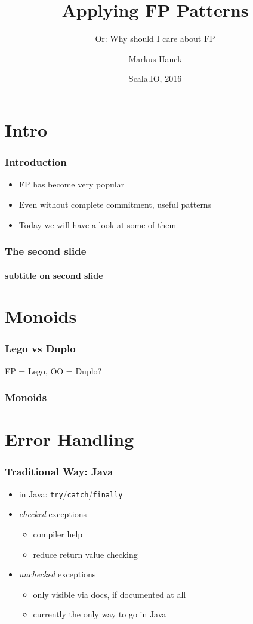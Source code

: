 \documentclass{beamer}
\title{Applying FP Patterns}
\subtitle{Or: Why should I care about FP}
\author{Markus Hauck}
\date{Scala.IO, 2016}
\begin{document}
\frame{\titlepage}

\section{Intro}
\label{sec:intro}

\begin{frame}
  \frametitle{Introduction}
  \begin{itemize}
  \item FP has become very popular
  \item Even without complete commitment, useful patterns
  \item Today we will have a look at some of them
  \end{itemize}
\end{frame}
\begin{frame}
  \frametitle{The second slide}
  \framesubtitle{subtitle on second slide}
\end{frame}

\section{Monoids}
\label{sec:monoids}

\begin{frame}
  \frametitle{Lego vs Duplo}
  FP = Lego, OO = Duplo?
\end{frame}

\begin{frame}
  \frametitle{Monoids}

\end{frame}

\section{Error Handling}
\label{sec:error-handling}

\begin{frame}
  \frametitle{Traditional Way: Java}
  \begin{itemize}
  \item in Java: \texttt{try}/\texttt{catch}/\texttt{finally}
  \item \textit{checked} exceptions
    \begin{itemize}
    \item compiler help
    \item reduce return value checking
    \end{itemize}
  \item \textit{unchecked} exceptions
    \begin{itemize}
    \item only visible via docs, if documented at all
    \item currently the only way to go in Java
    \end{itemize}
  \end{itemize}
\end{frame}
\end{document}
